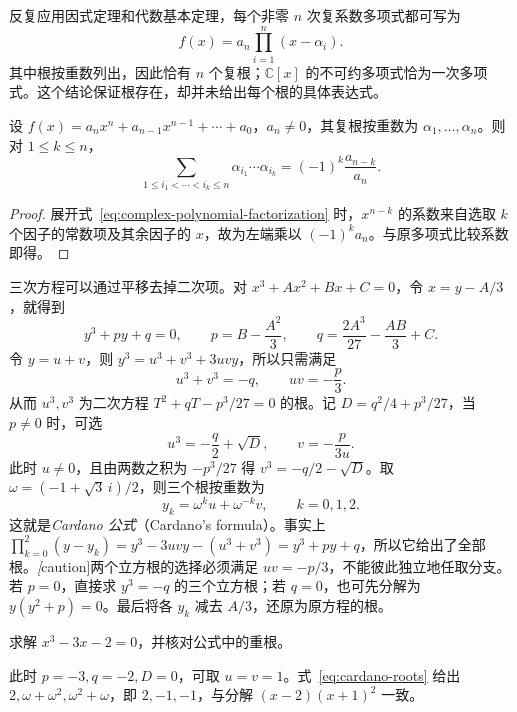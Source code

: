 反复应用因式定理和代数基本定理，每个非零 $n$ 次复系数多项式都可写为
\begin{equation}
\label{eq:complex-polynomial-factorization}
    f(x)=a_n\prod_{i=1}^n(x-\alpha_i).
\end{equation}
其中根按重数列出，因此恰有 $n$ 个复根；$\mathbb C[x]$ 的不可约多项式恰为一次多项式。这个结论保证根存在，却并未给出每个根的具体表达式。

\begin{theorem}[Vieta 定理]
\label{thm:polynomial-vieta}
设 $f(x)=a_nx^n+a_{n-1}x^{n-1}+\cdots+a_0$，$a_n\ne0$，其复根按重数为 $\alpha_1,\ldots,\alpha_n$。则对 $1\leq k\leq n$，
\begin{equation}
\label{eq:polynomial-vieta}
    \sum_{1\leq i_1<\cdots<i_k\leq n}
    \alpha_{i_1}\cdots\alpha_{i_k}
    =(-1)^k\frac{a_{n-k}}{a_n}.
\end{equation}
\end{theorem}
\begin{proof}
展开式~\eqref{eq:complex-polynomial-factorization} 时，$x^{n-k}$ 的系数来自选取 $k$ 个因子的常数项及其余因子的 $x$，故为左端乘以 $(-1)^ka_n$。与原多项式比较系数即得。
\end{proof}

三次方程可以通过平移去掉二次项。对 $x^3+Ax^2+Bx+C=0$，令 $x=y-A/3$，就得到
\[
    y^3+py+q=0,\qquad
    p=B-\frac{A^2}{3},\qquad
    q=\frac{2A^3}{27}-\frac{AB}{3}+C.
\]
令 $y=u+v$，则 $y^3=u^3+v^3+3uvy$，所以只需满足
\[
    u^3+v^3=-q,\qquad uv=-\frac p3.
\]
从而 $u^3,v^3$ 为二次方程 $T^2+qT-p^3/27=0$ 的根。记 $D=q^2/4+p^3/27$，当 $p\ne0$ 时，可选
\[
    u^3=-\frac q2+\sqrt D,\qquad v=-\frac{p}{3u}.
\]
此时 $u\ne0$，且由两数之积为 $-p^3/27$ 得 $v^3=-q/2-\sqrt D$。取 $\omega=(-1+\sqrt3\,i)/2$，则三个根按重数为
\begin{equation}
\label{eq:cardano-roots}
    y_k=\omega^ku+\omega^{-k}v,\qquad k=0,1,2.
\end{equation}
这就是\emph{Cardano 公式}（Cardano's formula）。事实上 $\prod_{k=0}^2(y-y_k)=y^3-3uvy-(u^3+v^3)=y^3+py+q$，所以它给出了全部根。\emph[caution]{两个立方根的选择必须满足 $uv=-p/3$，不能彼此独立地任取分支。}若 $p=0$，直接求 $y^3=-q$ 的三个立方根；若 $q=0$，也可先分解为 $y(y^2+p)=0$。最后将各 $y_k$ 减去 $A/3$，还原为原方程的根。

\begin{example}
求解 $x^3-3x-2=0$，并核对公式中的重根。
\end{example}
\begin{solve}
此时 $p=-3,q=-2,D=0$，可取 $u=v=1$。式~\eqref{eq:cardano-roots} 给出 $2,\omega+\omega^2,\omega^2+\omega$，即 $2,-1,-1$，与分解 $(x-2)(x+1)^2$ 一致。
\end{solve}

